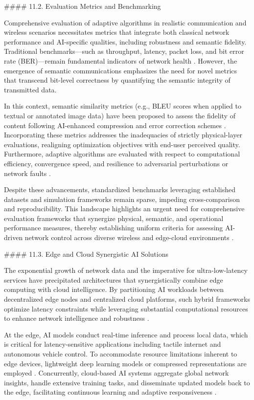 \documentclass[11pt]{article}
\begin{document}
\begin{itemize}
#### 11.2. Evaluation Metrics and Benchmarking

Comprehensive evaluation of adaptive algorithms in realistic communication and wireless scenarios necessitates metrics that integrate both classical network performance and AI-specific qualities, including robustness and semantic fidelity. Traditional benchmarks—such as throughput, latency, packet loss, and bit error rate (BER)—remain fundamental indicators of network health \cite{3,5}. However, the emergence of semantic communications emphasizes the need for novel metrics that transcend bit-level correctness by quantifying the semantic integrity of transmitted data.

In this context, semantic similarity metrics (e.g., BLEU scores when applied to textual or annotated image data) have been proposed to assess the fidelity of content following AI-enhanced compression and error correction schemes \cite{1,3,50}. Incorporating these metrics addresses the inadequacies of strictly physical-layer evaluations, realigning optimization objectives with end-user perceived quality. Furthermore, adaptive algorithms are evaluated with respect to computational efficiency, convergence speed, and resilience to adversarial perturbations or network faults \cite{5,7,10}.

Despite these advancements, standardized benchmarks leveraging established datasets and simulation frameworks remain sparse, impeding cross-comparison and reproducibility. This landscape highlights an urgent need for comprehensive evaluation frameworks that synergize physical, semantic, and operational performance measures, thereby establishing uniform criteria for assessing AI-driven network control across diverse wireless and edge-cloud environments \cite{50}.

#### 11.3. Edge and Cloud Synergistic AI Solutions

The exponential growth of network data and the imperative for ultra-low-latency services have precipitated architectures that synergistically combine edge computing with cloud intelligence. By partitioning AI workloads between decentralized edge nodes and centralized cloud platforms, such hybrid frameworks optimize latency constraints while leveraging substantial computational resources to enhance network intelligence and robustness \cite{8,9,13,16,49,50}.

At the edge, AI models conduct real-time inference and process local data, which is critical for latency-sensitive applications including tactile internet and autonomous vehicle control. To accommodate resource limitations inherent to edge devices, lightweight deep learning models or compressed representations are employed \cite{8,13}. Concurrently, cloud-based AI systems aggregate global network insights, handle extensive training tasks, and disseminate updated models back to the edge, facilitating continuous learning and adaptive responsiveness \cite{9,16}.


\end{itemize}
\end{document}
